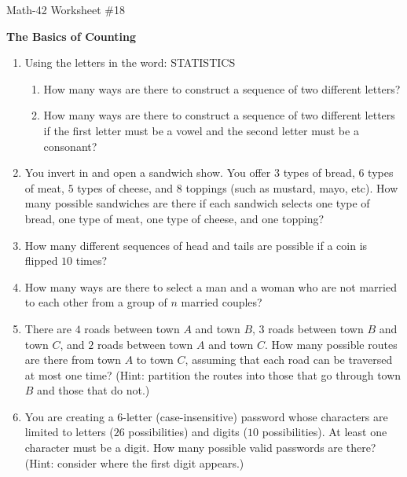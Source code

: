 \documentclass[letterpaper,12pt,fleqn]{article}
\begin{document}
\begin{center}
  \large Math-42 Worksheet \#18

  \textbf{The Basics of Counting}
\end{center}

\vspace{0.5in}

\begin{enumerate}[left=0in,itemsep=0.5in]
\item Using the letters in the word: STATISTICS
  \begin{enumerate}
  \item How many ways are there to construct a sequence of two different letters?
  \item How many ways are there to construct a sequence of two different letters if the first letter must be a
    vowel and the second letter must be a consonant?
  \end{enumerate}

\item You invert in and open a sandwich show.  You offer \(3\) types of bread, \(6\) types of meat, \(5\) types of
  cheese, and \(8\) toppings (such as mustard, mayo, etc).  How many possible sandwiches are there if each sandwich
  selects one type of bread, one type of meat, one type of cheese, and one topping?

\item How many different sequences of head and tails are possible if a coin is flipped \(10\) times?

\item How many ways are there to select a man and a woman who are not married to each other from a group of \(n\)
  married couples?

\item There are \(4\) roads between town \(A\) and town \(B\), \(3\) roads between town \(B\) and town \(C\), and
  \(2\) roads between town \(A\) and town \(C\).  How many possible routes are there from town \(A\) to town \(C\),
  assuming that each road can be traversed at most one time?  (Hint: partition the routes into those that go
  through town \(B\) and those that do not.)

\item You are creating a \(6\)-letter (case-insensitive) password whose characters are limited to letters (\(26\)
  possibilities) and digits (\(10\) possibilities).  At least one character must be a digit.  How many possible
  valid passwords are there?  (Hint: consider where the first digit appears.)


\end{enumerate}
\end{document}
